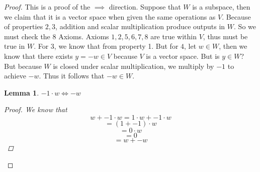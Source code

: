 \documentclass{article}
\newtheorem{lemma}[theorem]{Lemma}
\newtheorem{one minute paper}[theorem]{One Minute Paper}
\begin{document}
\begin{proof}
    This is a proof of the $\implies$ direction. Suppose that $W$ is a subspace, then we claim that it is a vector space when given the same operations as $V$. Because of properties $2, 3$, addition and scalar multiplication produce outputs in $W$. 
    So we must check the 8 Axioms. Axioms $1,2,5,6,7,8$ are true within $V$, thus must be true in $W$. For $3$, we know that from property 1. But for $4$, let $w \in W$, then we know that there exists $y = -w \in V$ because $V$ is a vector space. But is $y \in W$? But because $W$ is closed under scalar multiplication, we multiply by $-1$ to achieve $-w$.
    Thus it follows that $-w \in W$. 
    \begin{lemma}
        $-1 \cdot w \iff -w$
        \begin{proof}
            We know that
            \begin{equation}
                w + -1 \cdot w = 1 \cdot w + -1 \cdot w
            \end{equation}
            \begin{equation}
                = (1 + -1) \cdot w 
            \end{equation}
            \begin{equation}
                = 0 \cdot w
            \end{equation}
            \begin{equation}
                = 0
            \end{equation}
            \begin{equation}
                = w + -w
            \end{equation}
        \end{proof}
    \end{lemma}
\end{proof}
\end{document}
